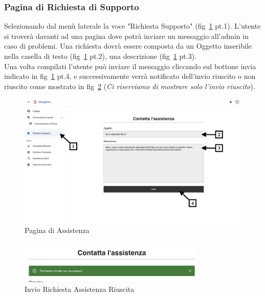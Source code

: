 \subsubsection{Pagina di Richiesta di Supporto}
Selezionando dal menù laterale la voce "Richiesta Supporto" (fig~\ref{fig:Pagina di Assistenza} pt.1). L'utente si troverà davanti ad una pagina dove potrà inviare un messaggio all'admin in caso di problemi.
Una richiesta dovrà essere composta da un Oggetto inseribile nella casella di testo (fig~\ref{fig:Pagina di Assistenza} pt.2), una descrizione (fig~\ref{fig:Pagina di Assistenza} pt.3).\\
Una volta compilati l'utente può inviare il messaggio cliccando sul bottone invia indicato in fig~\ref{fig:Pagina di Assistenza} pt.4, e successivamente verrà notificato dell'invio riuscito o non riuscito come mostrato in fig~\ref{fig:InvioRiuscito} (\textit{Ci riserviamo di mostrare solo l'invio riuscito}).
\begin{figure}[h!]
    \centering
    \includegraphics[width=\textwidth]{./img/RichiestaAssistenza1.png}
    \caption{Pagina di Assistenza}
    \label{fig:Pagina di Assistenza}
\end{figure}
\begin{figure}[h!]
    \centering
    \includegraphics[width=0.8\textwidth]{./img/RichiestaAssistenza2.png}
    \caption{Invio Richiesta Assistenza Riuscita}
    \label{fig:InvioRiuscito}
\end{figure}

